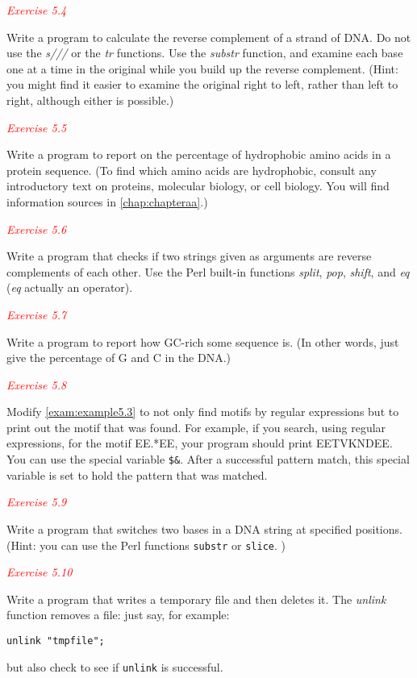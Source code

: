 \textcolor{red}{\textit{Exercise 5.4}}
\begin{adjustwidth}{1cm}{}
Write a program to calculate the reverse complement of a strand of DNA.  Do not use the \textit{s///} or the \textit{tr} functions. Use the \textit{substr} function, and examine each base one at a time in the original while you build up the reverse complement. (Hint: you might find it easier to examine the original right to left, rather than left to right, although either is possible.) 
\end{adjustwidth}

\textcolor{red}{\textit{Exercise 5.5}}
\begin{adjustwidth}{1cm}{}
Write a program to report on the percentage of hydrophobic amino acids in a protein sequence. (To find which amino acids are hydrophobic, consult any introductory text on proteins, molecular biology, or cell biology. You will find information sources in \autoref{chap:chapteraa}.) 
\end{adjustwidth}

\textcolor{red}{\textit{Exercise 5.6}}
\begin{adjustwidth}{1cm}{}
Write a program that checks if two strings given as arguments are
reverse complements of each other. Use the Perl built-in functions
\textit{split}, \textit{pop}, \textit{shift}, and \textit{eq} (\textit{eq} actually an operator). 
\end{adjustwidth}

\textcolor{red}{\textit{Exercise 5.7}}
\begin{adjustwidth}{1cm}{}
Write a program to report how GC-rich some sequence is. (In other words, just give the percentage of G and C in the DNA.)
\end{adjustwidth}

\textcolor{red}{\textit{Exercise 5.8}}
\begin{adjustwidth}{1cm}{}
Modify \autoref{exam:example5.3} to not only find motifs by regular expressions but to print out the motif that was found. For example, if you search, using regular expressions, for the motif EE.*EE, your program should print EETVKNDEE. You can use the special variable \verb|$&|. After a successful pattern match, this special variable is set to hold the pattern that was matched. 
\end{adjustwidth}

\textcolor{red}{\textit{Exercise 5.9}}
\begin{adjustwidth}{1cm}{}
Write a program that switches two bases in a DNA string at specified positions. (Hint: you can use the Perl functions \verb|substr| or \verb|slice|. )
\end{adjustwidth}

\textcolor{red}{\textit{Exercise 5.10}}
\begin{adjustwidth}{1cm}{}
Write a program that writes a temporary file and then deletes it.  The \textit{unlink} function removes a file: just say, for example:
\begin{lstlisting}
unlink "tmpfile";
\end{lstlisting}
but also check to see if \verb|unlink| is successful.
\end{adjustwidth}
